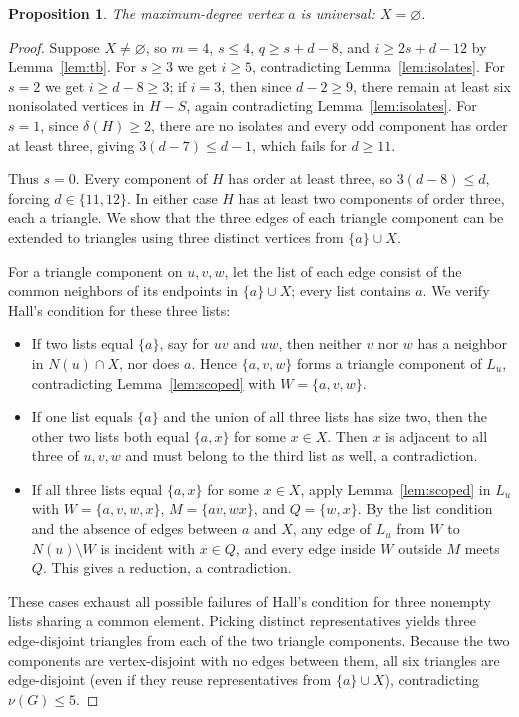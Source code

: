\documentclass[11pt]{article}
\newtheorem{proposition}[theorem]{Proposition}
\begin{document}
\begin{proposition}\label{prop:universal}
The maximum-degree vertex $a$ is universal: $X=\varnothing$.
\end{proposition}

\begin{proof}
Suppose $X\neq\varnothing$, so $m=4$, $s\leq 4$, $q\geq s+d-8$, and $i\geq 2s+d-12$ by Lemma~\ref{lem:tb}. For $s\geq 3$ we get $i\geq 5$, contradicting Lemma~\ref{lem:isolates}. For $s=2$ we get $i\geq d-8\geq 3$; if $i=3$, then since $d-2\geq 9$, there remain at least six nonisolated vertices in $H-S$, again contradicting Lemma~\ref{lem:isolates}. For $s=1$, since $\delta(H)\geq 2$, there are no isolates and every odd component has order at least three, giving $3(d-7)\leq d-1$, which fails for $d\geq 11$.

Thus $s=0$. Every component of $H$ has order at least three, so $3(d-8)\leq d$, forcing $d\in\{11,12\}$. In either case $H$ has at least two components of order three, each a triangle. We show that the three edges of each triangle component can be extended to triangles using three distinct vertices from $\{a\}\cup X$.

For a triangle component on $u,v,w$, let the list of each edge consist of the common neighbors of its endpoints in $\{a\}\cup X$; every list contains $a$. We verify Hall's condition for these three lists:
\begin{itemize}
\item If two lists equal $\{a\}$, say for $uv$ and $uw$, then neither $v$ nor $w$ has a neighbor in $N(u)\cap X$, nor does $a$. Hence $\{a,v,w\}$ forms a triangle component of $L_u$, contradicting Lemma~\ref{lem:scoped} with $W=\{a,v,w\}$.
\item If one list equals $\{a\}$ and the union of all three lists has size two, then the other two lists both equal $\{a,x\}$ for some $x\in X$. Then $x$ is adjacent to all three of $u,v,w$ and must belong to the third list as well, a contradiction.
\item If all three lists equal $\{a,x\}$ for some $x\in X$, apply Lemma~\ref{lem:scoped} in $L_u$ with $W=\{a,v,w,x\}$, $M=\{av,wx\}$, and $Q=\{w,x\}$. By the list condition and the absence of edges between $a$ and $X$, any edge of $L_u$ from $W$ to $N(u)\setminus W$ is incident with $x\in Q$, and every edge inside $W$ outside $M$ meets $Q$. This gives a reduction, a contradiction.
\end{itemize}
These cases exhaust all possible failures of Hall's condition for three nonempty lists sharing a common element. Picking distinct representatives yields three edge-disjoint triangles from each of the two triangle components. Because the two components are vertex-disjoint with no edges between them, all six triangles are edge-disjoint (even if they reuse representatives from $\{a\}\cup X$), contradicting $\nu(G)\leq 5$.
\end{proof}
\end{document}
